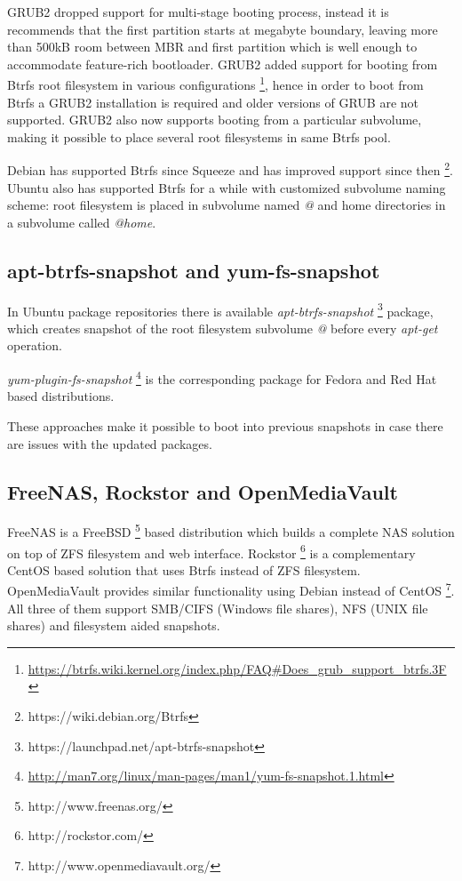 \documentclass{article}
\begin{document}
GRUB2 dropped support for multi-stage booting process,
instead it is recommends that the first partition
starts at megabyte boundary, leaving
more than 500kB room between MBR
and first partition which is well enough to accommodate
feature-rich bootloader.
GRUB2 added support for booting from Btrfs root filesystem
in various configurations
\footnote{\url{https://btrfs.wiki.kernel.org/index.php/FAQ#Does_grub_support_btrfs.3F}},
hence in order to boot from
Btrfs a GRUB2 installation is required and older versions of
GRUB are not supported.
GRUB2 also now supports booting from a particular subvolume,
making it possible to place several root filesystems
in same Btrfs pool.

Debian has supported Btrfs since Squeeze and has improved support
since then \footnote{https://wiki.debian.org/Btrfs}.
Ubuntu also has supported Btrfs for a while with customized
subvolume naming scheme:
root filesystem is placed in subvolume named \emph{@}
and home directories in a subvolume called \emph{@home}.

\subsection{apt-btrfs-snapshot and yum-fs-snapshot}

In Ubuntu package repositories there is available
\emph{apt-btrfs-snapshot}
\footnote{https://launchpad.net/apt-btrfs-snapshot}
package,
which creates snapshot of the root filesystem subvolume \emph{@}
before every \emph{apt-get} operation.

\emph{yum-plugin-fs-snapshot}
\footnote{\url{http://man7.org/linux/man-pages/man1/yum-fs-snapshot.1.html}}
is the corresponding package for Fedora and
Red Hat based distributions.

These approaches make it possible to boot into previous snapshots
in case there are issues with the updated packages.

\subsection{FreeNAS, Rockstor and OpenMediaVault}

FreeNAS is a FreeBSD \footnote{http://www.freenas.org/}
based distribution which builds a complete NAS solution on top of
ZFS filesystem and web interface.
Rockstor \footnote{http://rockstor.com/}
is a complementary CentOS based solution that uses Btrfs instead
of ZFS filesystem.
OpenMediaVault provides similar functionality using Debian instead of CentOS
\footnote{http://www.openmediavault.org/}.
All three of them support SMB/CIFS (Windows file shares),
NFS (UNIX file shares) and filesystem aided snapshots.
\end{document}
